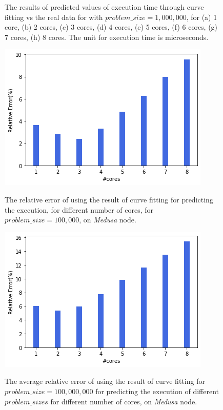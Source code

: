\begin{figure}[H]
{		\label{fig50:h}}\hfill
	\caption{The results of predicted values of execution time through curve fitting vs the real data for with $problem\_size=1,000,000$, for (a) 1 core, (b) 2 cores, (c) 3 cores, (d) 4 cores, (e) 5 cores, (f) 6 cores, (g) 7 cores, (h) 8 cores. The unit for execution time is microseconds.}
	\label{fig50}	
\end{figure}

\begin{figure}[H]
	\centering
	{\includegraphics[scale=.45]{images/hpx_for_loop/fitted/medusa_relative_error_100000.png}}
	\caption{The relative error of using the result of curve fitting for predicting the execution, for different number of cores, for $problem\_size=100,000$, on \textit{Medusa} node.}\label{fig47}		
\end{figure}



\begin{figure}[H]
	\centering
	{\includegraphics[scale=.45]{images/hpx_for_loop/fitted/medusa_relative_error_all.png}}
	\caption{The average relative error of using the result of curve fitting for $problem\_size=100,000,000$ for predicting the execution of different $problem\_{sizes}$ for different number of cores, on \textit{Medusa} node.}\label{fig48}		
\end{figure}

